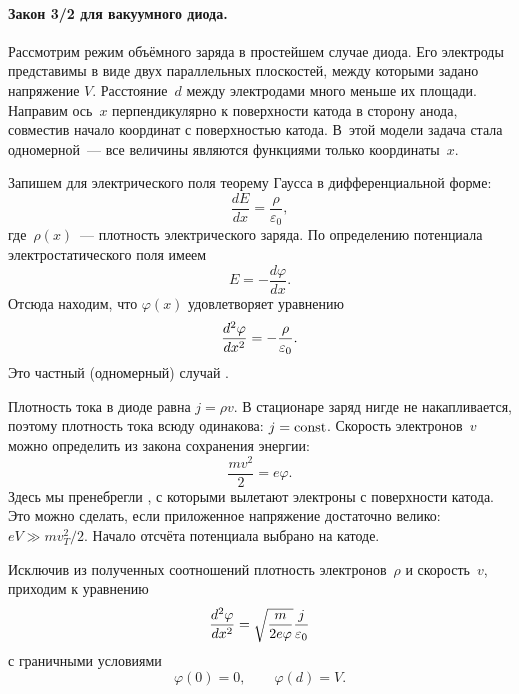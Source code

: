 \paragraph{Закон 3/2 для вакуумного диода.}
Рассмотрим режим объёмного заряда в простейшем случае  диода.
Его электроды представимы в виде двух параллельных плоскостей,
между которыми задано напряжение $V$. Расстояние~$d$ между электродами много
меньше их площади. Направим ось~$x$ перпендикулярно к поверхности катода
в сторону анода, совместив начало координат с поверхностью
катода. В~этой модели задача стала одномерной~--- все величины являются
функциями только координаты~$x$.

Запишем для электрического поля теорему Гаусса в дифференциальной форме:
\[
\frac{dE}{dx} = \frac{\rho}{\varepsilon_0},
\]
где~$\rho(x)$~--- плотность электрического заряда. По определению потенциала
электростатического поля имеем
\[
E = -\frac{d\varphi}{dx}.
\]
Отсюда находим, что $\varphi(x)$ удовлетворяет уравнению
\begin{equation}
	\eqmark{3.14}
	\frac{d^2\varphi}{dx^2}=-\frac{\rho}{\varepsilon_0}.
\end{equation}
Это частный (одномерный) случай .

Плотность тока в диоде равна $j=\rho v$. В стационаре заряд нигде не
накапливается, поэтому плотность тока всюду одинакова: $j=\mathrm{const}$.
Скорость электронов~$v$ можно определить из закона сохранения энергии:
\begin{equation*}
	\frac{mv^2}{2}=e\varphi.
\end{equation*}
Здесь мы пренебрегли ,
с которыми вылетают электроны с поверхности катода. Это можно сделать, если
приложенное напряжение достаточно велико: $eV\gg mv_{T}^2/2$. Начало отсчёта
потенциала выбрано на катоде.

Исключив из полученных соотношений плотность электронов~$\rho$ и скорость~$v$,
приходим к уравнению
\begin{equation}
	\eqmark{3.15}
    \frac{d^2\varphi}{dx^2}=\sqrt{\frac{m}{2e\varphi}} \frac{j}{\varepsilon_0}
\end{equation}
с граничными условиями
\begin{equation*}
 \varphi(0)=0,\qquad \varphi(d)=V.
\end{equation*}

